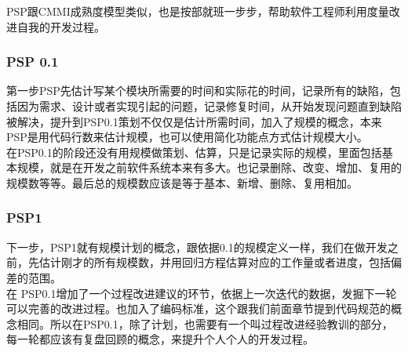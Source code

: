 
PSP跟CMMI成熟度模型类似，也是按部就班一步步，帮助软件工程师利用度量改进自我的开发过程。

\hypertarget{psp-0.1}{%
\subsubsection{PSP 0.1}\label{psp-0.1}}

第一步PSP先估计写某个模块所需要的时间和实际花的时间，记录所有的缺陷，包括因为需求、设计或者实现引起的问题，记录修复时间，从开始发现问题直到缺陷被解决，提升到PSP0.1策划不仅仅是估计所需时间，加入了规模的概念，本来PSP是用代码行数来估计规模，也可以使用简化功能点方式估计规模大小。\\
在PSP0.1的阶段还没有用规模做策划、估算，只是记录实际的规模，里面包括基本规模，就是在开发之前软件系统本来有多大。也记录删除、改变、增加、复用的规模数等等。最后总的规模数应该是等于基本、新增、删除、复用相加。

\hypertarget{psp1}{%
\subsubsection{PSP1}\label{psp1}}

下一步，PSP1就有规模计划的概念，跟依据0.1的规模定义一样，我们在做开发之前，先估计刚才的所有规模数，并用回归方程估算对应的工作量或者进度，包括偏差的范围。\\
在
PSP0.1增加了一个过程改进建议的环节，依据上一次迭代的数据，发掘下一轮可以完善的改进过程。也加入了编码标准，这个跟我们前面章节提到代码规范的概念相同。所以在PSP0.1，除了计划，也需要有一个叫过程改进经验教训的部分，每一轮都应该有复盘回顾的概念，来提升个人个人的开发过程。

